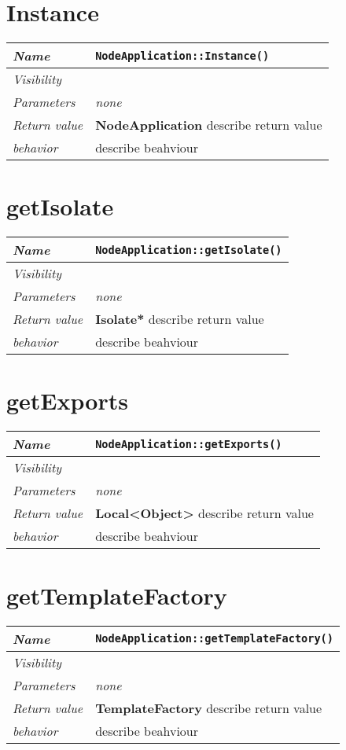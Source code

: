  \section{Instance}
\begin{longtable}{p{3cm} @{\hskip 1cm} p{12cm}}
 \hline
\textit{Name} & \texttt{NodeApplication::Instance()}\\
\hline
 \textit{Visibility} & \\
\hline
\textit{Parameters} & \textit{none}\\
\hline
\textit{Return value} & \textbf{ NodeApplication} describe return value\\
  \hline
 \textit{behavior} & describe beahviour \\
\hline
\end{longtable} \pagebreak
 \section{getIsolate}
\begin{longtable}{p{3cm} @{\hskip 1cm} p{12cm}}
 \hline
\textit{Name} & \texttt{NodeApplication::getIsolate()}\\
\hline
 \textit{Visibility} & \\
\hline
\textit{Parameters} & \textit{none}\\
\hline
\textit{Return value} & \textbf{ Isolate*} describe return value\\
  \hline
 \textit{behavior} & describe beahviour \\
\hline
\end{longtable} \pagebreak
 \section{getExports}
\begin{longtable}{p{3cm} @{\hskip 1cm} p{12cm}}
 \hline
\textit{Name} & \texttt{NodeApplication::getExports()}\\
\hline
 \textit{Visibility} & \\
\hline
\textit{Parameters} & \textit{none}\\
\hline
\textit{Return value} & \textbf{ Local<Object>} describe return value\\
  \hline
 \textit{behavior} & describe beahviour \\
\hline
\end{longtable} \pagebreak
 \section{getTemplateFactory}
\begin{longtable}{p{3cm} @{\hskip 1cm} p{12cm}}
 \hline
\textit{Name} & \texttt{NodeApplication::getTemplateFactory()}\\
\hline
 \textit{Visibility} & \\
\hline
\textit{Parameters} & \textit{none}\\
\hline
\textit{Return value} & \textbf{ TemplateFactory} describe return value\\
  \hline
 \textit{behavior} & describe beahviour \\
\hline
\end{longtable} \pagebreak
